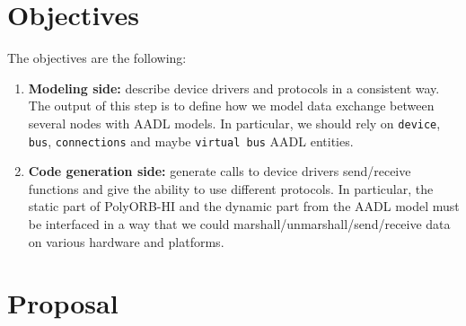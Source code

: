\documentclass[11pt]{article}
\newcommand{\Concept}[1]{#1\xspace}
\newcommand{\aadl}{\Concept{AADL}}
\newcommand{\polyorbhi}{\Concept{PolyORB-HI}}
\begin{document}
\section{Objectives}
The objectives are the following:
\begin{enumerate}
   \item
      \textbf{Modeling side:} describe device drivers and protocols in a
      consistent way. The output of this step is to define how we model data
      exchange between several nodes with \aadl models. In particular, we should
      rely on \texttt{device}, \texttt{bus}, \texttt{connections} and maybe
      \texttt{virtual bus} \aadl entities.
   \item
      \textbf{Code generation side:} generate calls to device drivers
      send/receive functions and give the ability to use different protocols. In
      particular, the static part of \polyorbhi and the dynamic part from the
      \aadl model must be interfaced in a way that we could
      marshall/unmarshall/send/receive data on various hardware and platforms.
\end{enumerate}

\section{Proposal}
\end{document}
